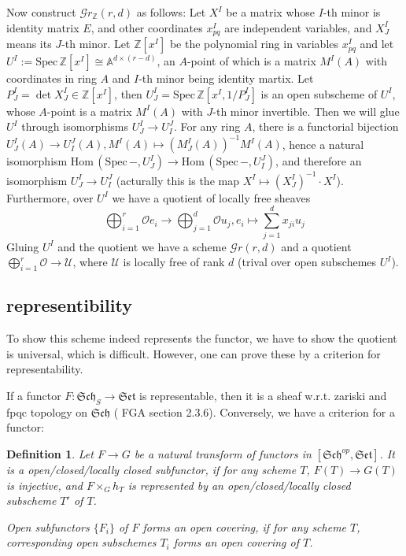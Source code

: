 \documentclass{article}
\newtheorem{defn}{Definition}[section]
\newcommand{\Spec}{\mathrm{Spec}\,}
\newcommand{\Hom}{\mathrm{Hom}\,}
\begin{document}
Now construct $ \mathcal{G}r_\mathbb{Z}(r,d) $ as follows: Let $ X^I $ be a matrix whose $ I $-th minor is identity matrix $ E $, and other coordinates $ x^I_{pq} $ are independent variables, and $ X^I_J $ means its $ J $-th minor. Let $ \mathbb{Z}[x^I] $ be the polynomial ring in variables $ x^I_{pq} $ and let $ U^I:=\Spec \mathbb{Z}[x^I]\cong \mathbb{A}^{d\times(r-d)} $, an $ A $-point of which is a matrix $ M^I(A) $ with coordinates in ring $ A $ and $ I $-th minor being identity martix.  Let  $ P^I_J=\det X^I_J\in \mathbb{Z}[x^I] $,   then $ U^I_J=\Spec \mathbb{Z}[x^I,1/P^I_J] $ is an open subscheme of $ U^I $, whose $ A $-point is a matrix $ M^I(A) $ with $ J $-th minor invertible. Then we will glue $ U^I $ through isomorphisms $ U^I_J\to U^J_I $. For any ring $ A $, there is a  functorial bijection  $ U^I_J(A)\to U^J_I(A) , M^I(A)\mapsto (M^I_J(A))^{-1}M^I(A) $, hence a natural isomorphism $ \Hom(\Spec -,U^I_J)\to \Hom(\Spec-,U^J_I) $, and therefore an isomorphism   $ U^I_J\to U^J_I $ (acturally this is the map $X^I \mapsto (X^I_J)^{-1}\cdot X^I $). Furthermore, over $ U^I $ we have a quotient of locally free sheaves 
$$ \bigoplus_{i=1}^r \mathcal{O}e_i\to \bigoplus_{j=1}^{d}\mathcal{O}u_j, e_i\mapsto \sum_{j=1}^dx_{ji}u_j $$ 
Gluing $ U^I $ and the quotient we have a scheme $ \mathcal{G}r(r,d) $ and a quotient $ \bigoplus_{i=1}^r\mathcal{O}\to \mathcal{U} $, where $ \mathcal{U} $ is locally free of rank $ d $ (trival over open subschemes $ U^I $).
\subsection{representibility}
To show this scheme indeed represents the functor, we have to show the quotient is universal, which is difficult. However, one can prove these by a criterion for representability.

If a functor $ F:\mathfrak{Sch}_S\to \mathfrak{Set}  $ is representable, then it is a sheaf w.r.t. zariski and fpqc topology on $ \mathfrak{Sch} $ ( FGA section 2.3.6). Conversely, we have a criterion for a functor:

	
\begin{defn}
	Let $ F\to G $ be a natural transform of functors in $ [\mathfrak{Sch}^{op},\mathfrak{Set}] $. It is a \emph{open/closed/locally closed subfunctor}, if for any scheme $ T $, $ F(T)\to G(T) $ is injective, and $ F\times_{G}h_T $ is represented by an open/closed/locally closed subscheme $ T' $ of  $ T $.
	
	Open subfunctors $ \{F_i\} $ of $ F $ forms an \emph{open covering}, if for any scheme $ T $, corresponding open subschemes $ T_i $ forms an open covering of $ T $.
\end{defn}
\end{document}
